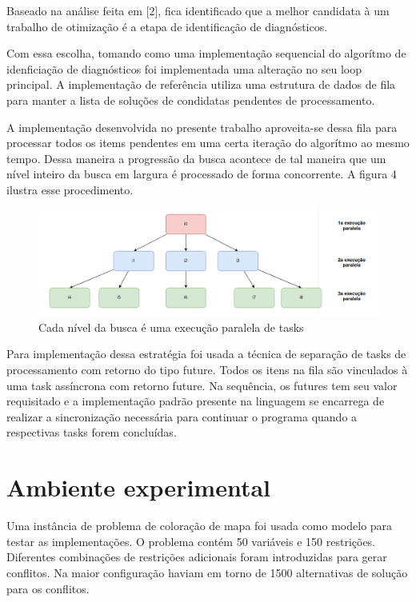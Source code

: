 \documentclass[conference]{IEEEtran}
\begin{document}
Baseado na análise feita em [2], fica identificado que a melhor candidata à um trabalho de otimização é a etapa de identificação de diagnósticos.

Com essa escolha, tomando como uma implementação sequencial do algorítmo de idenficiação de diagnósticos foi implementada uma alteração no seu loop principal. A implementação de referência utiliza uma estrutura de dados de fila para manter a lista de soluções de condidatas pendentes de processamento. 

A implementação desenvolvida no presente trabalho aproveita-se  dessa fila para processar todos os items pendentes em uma certa iteração do algorítmo ao mesmo tempo. Dessa maneira a progressão da busca acontece de tal maneira que um nível inteiro da busca em largura é processado de forma concorrente. A figura 4 ilustra esse procedimento.

\begin{figure}[htbp]
\centerline{\includegraphics[width=1\columnwidth]{runtime.png}}
\caption{Cada nível da busca é uma execução paralela de tasks} 
\label{fig}
\end{figure}

Para implementação dessa estratégia foi usada a técnica de separação de tasks de processamento com retorno do tipo future. Todos os itens na fila são vinculados à uma task assíncrona com retorno future. Na sequência, os futures tem seu valor requisitado e a implementação padrão presente na linguagem se encarrega de realizar a sincronização necessária para continuar o programa quando a respectivas tasks forem concluídas. 

\section{Ambiente experimental}

Uma instância de problema de coloração de mapa foi usada como modelo para testar as implementações. O problema contém 50 variáveis e 150 restrições. Diferentes combinações de restrições adicionais foram introduzidas para gerar conflitos. Na maior configuração haviam em torno de 1500 alternativas de solução para os conflitos. 
\end{document}
